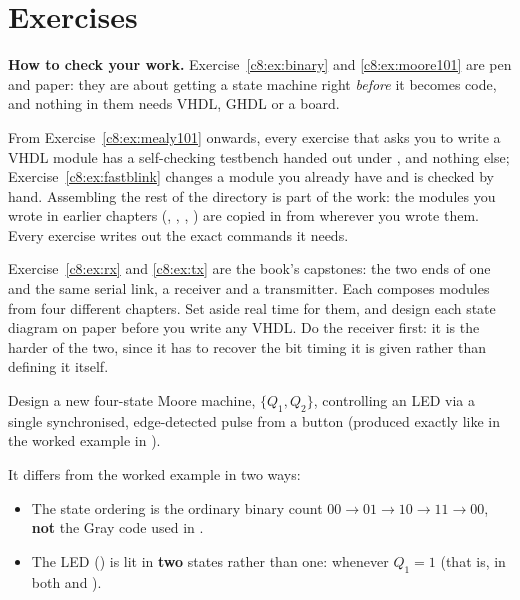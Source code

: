 
\section{Exercises}
\label{c8:sec:exercises}

\begin{aside}
\textbf{How to check your work.} Exercise~\ref{c8:ex:binary} and \ref{c8:ex:moore101} are pen and
paper: they are about getting a state machine right \emph{before} it becomes code, and nothing in
them needs VHDL, GHDL or a board.

From Exercise~\ref{c8:ex:mealy101} onwards, every exercise that asks you to write a VHDL module has a
self-checking testbench handed out under , and nothing else;
Exercise~\ref{c8:ex:fastblink} changes a module you already have and is checked by hand. Assembling
the rest of the directory is part of the work: the modules you wrote in earlier chapters
(, , , ) are copied in from wherever you
wrote them. Every exercise writes out the exact commands it needs.

Exercise~\ref{c8:ex:rx} and \ref{c8:ex:tx} are the book's capstones: the two ends of one and the
same serial link, a receiver and a transmitter. Each composes modules from four different chapters.
Set aside real time for them, and design each state diagram on paper before you write any VHDL. Do
the receiver first: it is the harder of the two, since it has to recover the bit timing it is given
rather than defining it itself.
\end{aside}


\label{c8:ex:binary}
Design a new four-state Moore machine, $\{Q_1, Q_2\}$, controlling an LED via a single synchronised,
edge-detected pulse  from a button (produced exactly like  in the worked example in
).

It differs from the worked example in two ways:
\begin{itemize}
  \item The state ordering is the ordinary binary count
    $00 \to 01 \to 10 \to 11 \to 00$, \textbf{not} the Gray code used in .
  \item The LED () is lit in \textbf{two} states rather than one: whenever $Q_1 = 1$ (that
    is, in both  and ).
\end{itemize}

